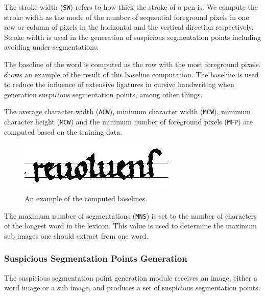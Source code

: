 	The stroke width (\texttt{SW}) refers to how thick the stroke of a pen is. We compute the stroke width as the mode of the number of sequential foreground pixels in one row or column of pixels in the horizontal and the vertical direction respectively. Stroke width is used in the generation of suspicious segmentation points including avoiding under-segmentations.

	The baseline of the word is computed as the row with the most foreground pixels.  shows an example of the result of this baseline computation. The baseline is used to reduce the influence of extensive ligatures in cursive handwriting when generation suspicious segmentation points, among other things.

	The average character width (\texttt{ACW}), minimum character width (\texttt{MCW}), minimum character height (\texttt{MCW}) and the minimum number of foreground pixels (\texttt{MFP}) are computed based on the training data.

	\begin{figure}
		\centering
		\includegraphics[width=\columnwidth]{shared/img/method/baseline_computation.jpg}
		\caption{An example of the computed baselines.}
		\label{fig:method:segmentation:baselinecomputation}
	\end{figure}

	The maximum number of segmentations (\texttt{MNS}) is set to the number of characters of the longest word in the lexicon. This value is used to determine the maximum sub images one should extract from one word. 

\subsubsection{Suspicious Segmentation Points Generation}
	\label{sss:method:segmentation:sspGeneration}
	The suspicious segmentation point generation module receives an image, either a word image or a sub image, and produces a set of suspicious segmentation points. 

